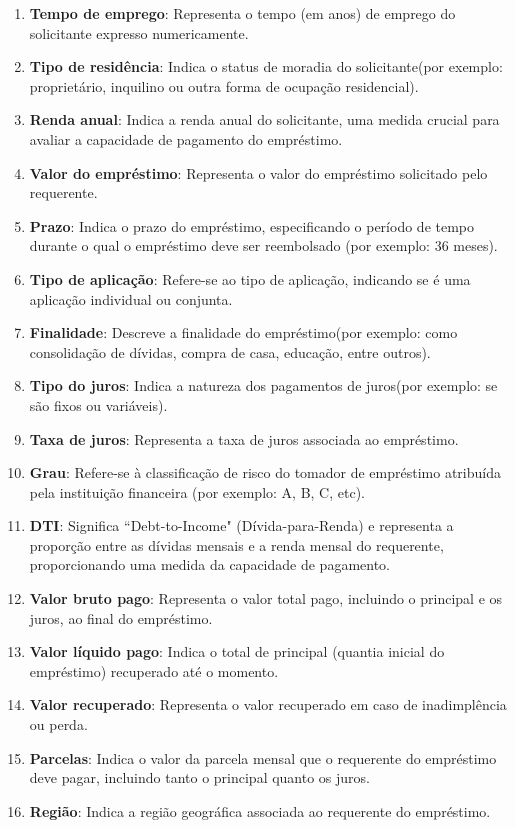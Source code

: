 \begin{enumerate}
  \item \textbf{Tempo de emprego}: Representa o tempo (em anos) de emprego do solicitante expresso numericamente. 
  \item \textbf{Tipo de residência}: Indica o status de moradia do solicitante(por exemplo: proprietário, inquilino ou outra forma de ocupação residencial). 
  \item \textbf{Renda anual}: Indica a renda anual do solicitante, uma medida crucial para avaliar a capacidade de pagamento do empréstimo. 
  \item \textbf{Valor do empréstimo}: Representa o valor do empréstimo solicitado pelo requerente.
  \item \textbf{Prazo}: Indica o prazo do empréstimo, especificando o período de tempo durante o qual o empréstimo deve ser reembolsado (por exemplo: 36 meses).
  \item \textbf{Tipo de aplicação}: Refere-se ao tipo de aplicação, indicando se é uma aplicação individual ou conjunta.
  \item \textbf{Finalidade}: Descreve a finalidade do empréstimo(por exemplo: como consolidação de dívidas, compra de casa, educação, entre outros).
  \item \textbf{Tipo do juros}: Indica a natureza dos pagamentos de juros(por exemplo: se são fixos ou variáveis). 
  \item \textbf{Taxa de juros}: Representa a taxa de juros associada ao empréstimo.
  \item \textbf{Grau}: Refere-se à classificação de risco do tomador de empréstimo atribuída pela instituição financeira (por exemplo: A, B, C, etc).
  \item \textbf{DTI}: Significa ``Debt-to-Income" (Dívida-para-Renda) e representa a proporção entre as dívidas mensais e a renda mensal do requerente, proporcionando uma medida da capacidade de pagamento.
  \item \textbf{Valor bruto pago}: Representa o valor total pago, incluindo o principal e os juros, ao final do empréstimo.
  \item \textbf{Valor líquido pago}: Indica o total de principal (quantia inicial do empréstimo) recuperado até o momento.
  \item \textbf{Valor recuperado}: Representa o valor recuperado em caso de inadimplência ou perda.
  \item \textbf{Parcelas}: Indica o valor da parcela mensal que o requerente do empréstimo deve pagar, incluindo tanto o principal quanto os juros.
  \item \textbf{Região}: Indica a região geográfica associada ao requerente do empréstimo.
\end{enumerate}



